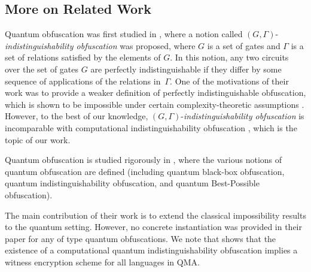\subsection{More on Related Work}
\label{sec:obf-quantum}
Quantum obfuscation was first studied in \cite{AJJ14}, where a notion called
$(G,\Gamma)$-{\em indistinguishability obfuscation} was proposed,  where $G$ is a set of gates and $\Gamma$ is a set of relations satisfied by the elements of $G$. In this notion, any two circuits over the set of gates $G$ are perfectly indistinguishable if they differ by some sequence of applications of the relations in~$\Gamma.$ One of the motivations of their work was to provide a weaker definition of perfectly indistinguishable obfuscation, which is shown to be impossible under certain complexity-theoretic assumptions \cite{AJJ14}. However, to the best of our knowledge, $(G,\Gamma)$-{\em indistinguishability obfuscation} is incomparable with computational indistinguishability obfuscation \cite{BGI+12, GGH+13}, which is the topic of our work.


Quantum obfuscation is studied rigorously in \cite{AF16arxiv}, where the various notions of quantum obfuscation are defined (including quantum black-box obfuscation, quantum indistinguishability obfuscation, and quantum Best-Possible obfuscation). 

%
 The main contribution of their work is to extend the classical impossibility results to the quantum setting.
 However, no concrete instantiation was provided in their paper for any of type quantum obfuscations.
  We note that  \cite{AF16arxiv} shows that the existence of a computational quantum indistinguishability obfuscation implies a witness encryption scheme for all languages in \textsf{QMA}.


%
%


